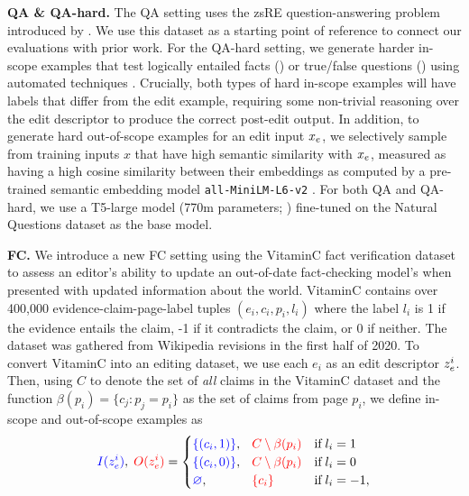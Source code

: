 \documentclass{article}
\begin{document}
\textbf{QA \& QA-hard.} The QA setting uses the zsRE question-answering problem introduced by \citet{Cao2021EditingFK}. We use this dataset as a starting point of reference to connect our evaluations with prior work. For the QA-hard setting, we generate harder in-scope examples that test logically entailed facts () or true/false questions () using automated techniques \citep{demszky2018transforming,ribeiro2019red}. Crucially, both types of hard in-scope examples will have labels that differ from the edit example, requiring some non-trivial reasoning over the edit descriptor to produce the correct post-edit output. In addition, to generate hard out-of-scope examples for an edit input $\xe$, we selectively sample from training inputs $x$ that have high semantic similarity with $\xe$, measured as having a high cosine similarity between their embeddings as computed by a pre-trained semantic embedding model \texttt{all-MiniLM-L6-v2} \citep{reimers-2019-sentence-bert}. For both QA and QA-hard, we use a T5-large model (770m parameters; \citet{2020t5}) fine-tuned on the Natural Questions dataset \citep{kwiatkowski2019natural,roberts2020knowledge} as the base model.

\textbf{FC.} We introduce a new FC setting using the VitaminC fact verification dataset \citep{schuster-etal-2021-get} to assess an editor's ability to update an out-of-date fact-checking model's when presented with updated information about the world. VitaminC contains over 400,000 evidence-claim-page-label tuples $(e_i, c_i, p_i, l_i)$ where the label $l_i$ is 1 if the evidence entails the claim, -1 if it contradicts the claim, or 0 if neither. The dataset was gathered from Wikipedia revisions in the first half of 2020. To convert VitaminC into an editing dataset, we use each $e_i$ as an edit descriptor $\ze[i]$. Then, using $C$ to denote the set of \textit{all} claims in the VitaminC dataset and the function $\beta(p_i)=\{c_j : p_j = p_i\}$ as the set of claims from page $p_i$, we define in-scope and out-of-scope examples as
\begin{equation*}
    \textcolor{blue}{I(\ze[i])},\;\textcolor{red}{O(\ze[i])} = \begin{cases}
        \textcolor{blue}{\{(c_i, 1)\}},\phantom{\varnothing} \textcolor{red}{C \setminus \beta(p_i)} & \text{if}\;l_i = 1 \\
        \textcolor{blue}{\{(c_i, 0)\}},\phantom{\varnothing} \textcolor{red}{C \setminus \beta(p_i)} & \text{if}\;l_i = 0 \\
        \textcolor{blue}{\varnothing},\phantom{\{(c_i, 0)\}} \textcolor{red}{\{c_i\}} & \text{if}\;l_i = -1,
    \end{cases}
\end{equation*}
\end{document}
